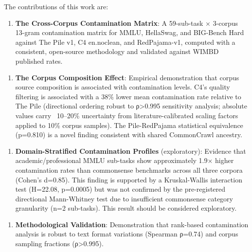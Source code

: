 The contributions of this work are:

\begin{enumerate}
\item \textbf{The Cross-Corpus Contamination Matrix}: A 59-sub-task × 3-corpus 13-gram contamination matrix for MMLU, HellaSwag, and BIG-Bench Hard against The Pile v1, C4 en.noclean, and RedPajama-v1, computed with a consistent, open-source methodology and validated against WIMBD published rates.
\end{enumerate}

\begin{enumerate}
\item \textbf{The Corpus Composition Effect}: Empirical demonstration that corpus source composition is associated with contamination levels. C4's quality filtering is associated with a 38\% lower mean contamination rate relative to The Pile (directional ordering robust to ρ>0.995 sensitivity analysis; absolute values carry ~10–20\% uncertainty from literature-calibrated scaling factors applied to 10\% corpus samples). The Pile-RedPajama statistical equivalence (p=0.810) is a novel finding consistent with shared CommonCrawl ancestry.
\end{enumerate}

\begin{enumerate}
\item \textbf{Domain-Stratified Contamination Profiles} (exploratory): Evidence that academic/professional MMLU sub-tasks show approximately 1.9× higher contamination rates than commonsense benchmarks across all three corpora (Cohen's d=0.85). This finding is supported by a Kruskal-Wallis interaction test (H=22.08, p=0.0005) but was not confirmed by the pre-registered directional Mann-Whitney test due to insufficient commonsense category granularity (n=2 sub-tasks). This result should be considered exploratory.
\end{enumerate}

\begin{enumerate}
\item \textbf{Methodological Validation}: Demonstration that rank-based contamination analysis is robust to text format variations (Spearman ρ=0.74) and corpus sampling fractions (ρ>0.995).
\end{enumerate}

